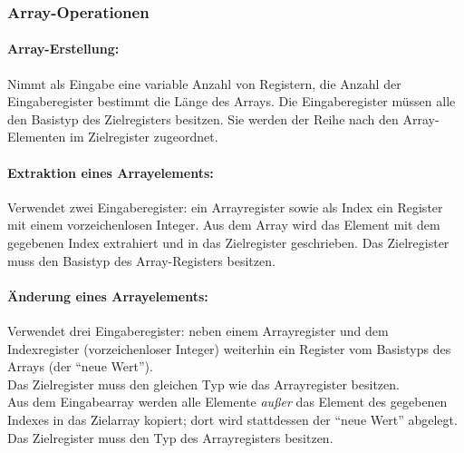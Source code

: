\documentclass[twoside,a4paper,fleqn,12pt]{book}
\begin{document}

\subsubsection{Array-Operationen}

\paragraph{Array-Erstellung:} Nimmt als Eingabe eine variable Anzahl von Registern, die Anzahl der Eingaberegister bestimmt die Länge des Arrays.
Die Eingaberegister müssen alle den Basistyp des Zielregisters besitzen. Sie werden der Reihe nach den Array-Elementen im Zielregister zugeordnet.



\paragraph{Extraktion eines Arrayelements:} Verwendet zwei Eingaberegister: ein Arrayregister sowie als Index ein Register mit einem vorzeichenlosen Integer.
Aus dem Array wird das Element mit dem gegebenen Index extrahiert und in das Zielregister geschrieben.
Das Zielregister muss den Basistyp des Array-Registers besitzen.



\paragraph{Änderung eines Arrayelements:} Verwendet drei Eingaberegister: neben einem Arrayregister und dem Indexregister (vorzeichenloser Integer)
weiterhin ein Register vom Basistyps des Arrays (der "`neue Wert"').\\
Das Zielregister muss den gleichen Typ wie das Arrayregister besitzen.\\
Aus dem Eingabearray werden alle Elemente \emph{außer} das Element des gegebenen Indexes in das Zielarray kopiert;
dort wird stattdessen der "`neue Wert"' abgelegt. Das Zielregister muss den Typ des Arrayregisters besitzen.
\end{document}
